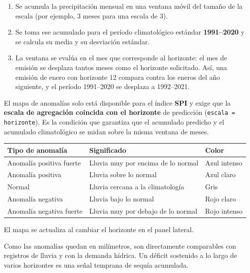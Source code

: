 \begin{enumerate}
    \item Se acumula la precipitación mensual en una ventana móvil del tamaño de la escala (por ejemplo, 3 meses para una escala de 3).
    \item Se toma ese acumulado para el período climatológico estándar \textbf{1991--2020} y se calcula su media y su desviación estándar.
    \item La ventana se evalúa en el mes que corresponde al horizonte: el mes de emisión se desplaza tantos meses como el horizonte solicitado. Así, una emisión de enero con horizonte 12 compara contra los eneros del año siguiente, y el período 1991--2020 se desplaza a 1992--2021.
\end{enumerate}

\begin{remark}
El mapa de anomalías solo está disponible para el índice \textbf{SPI} y exige que la \textbf{escala de agregación coincida con el horizonte} de predicción (\texttt{escala = horizonte}). Es la condición que garantiza que el acumulado predicho y el acumulado climatológico se midan sobre la misma ventana de meses.
\end{remark}

\begin{center}
\small
\begin{tabular}{@{}lll@{}}
\toprule
\textbf{Tipo de anomalía} & \textbf{Significado} & \textbf{Color} \\
\midrule
Anomalía positiva fuerte  & Lluvia muy por encima de lo normal & Azul intenso \\
Anomalía positiva         & Lluvia sobre lo normal             & Azul claro \\
Normal                    & Lluvia cercana a la climatología   & Gris \\
Anomalía negativa         & Lluvia bajo lo normal              & Rojo claro \\
Anomalía negativa fuerte  & Lluvia muy por debajo de lo normal & Rojo intenso \\
\bottomrule
\end{tabular}
\end{center}

El mapa se actualiza al cambiar el horizonte en el panel lateral.

\begin{remark}
Como las anomalías quedan en milímetros, son directamente comparables con registros de lluvia y con la demanda hídrica. Un déficit sostenido a lo largo de varios horizontes es una señal temprana de sequía acumulada.
\end{remark}

